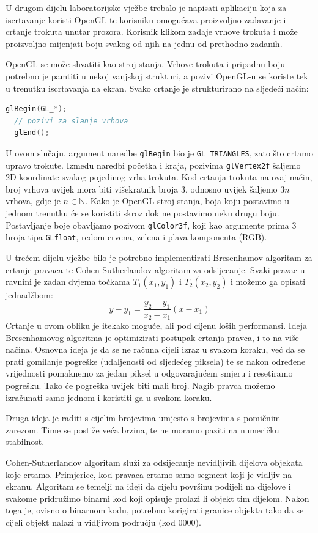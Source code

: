 \documentclass[a4paper,12pt]{article}
\begin{document}
U drugom dijelu laboratorijske vježbe trebalo je napisati aplikaciju koja
za iscrtavanje koristi OpenGL te korisniku omogućava proizvoljno zadavanje
i crtanje trokuta unutar prozora. Korisnik klikom zadaje vrhove trokuta i
može proizvoljno mijenjati boju svakog od njih na jednu od prethodno zadanih.

OpenGL se može shvatiti kao stroj stanja. Vrhove trokuta i pripadnu boju potrebno je pamtiti u nekoj vanjskoj strukturi, a pozivi OpenGL-u se koriste tek
u trenutku iscrtavanja na ekran. Svako crtanje je strukturirano na sljedeći
način:

\begin{lstlisting}[language=C]
  glBegin(GL_*);
  // pozivi za slanje vrhova
  glEnd();
\end{lstlisting}
U ovom slučaju, argument naredbe {\verb|glBegin|} bio je {\verb|GL_TRIANGLES|}, zato što crtamo upravo trokute. Između naredbi početka i kraja, pozivima
{\verb|glVertex2f|} šaljemo 2D koordinate svakog pojedinog vrha trokuta. Kod crtanja trokuta na ovaj način, broj vrhova uvijek mora biti višekratnik broja 3, odnosno uvijek šaljemo $3n$ vrhova, gdje je
$n \in \mathbb{N}$.
Kako je OpenGL stroj stanja, boja koju postavimo u jednom trenutku će se koristiti skroz dok ne postavimo neku drugu boju. Postavljanje boje obavljamo pozivom
{\verb|glColor3f|}, koji kao argumente prima 3 broja tipa {\verb|GLfloat|}, redom crvena, zelena i plava komponenta (RGB).

U trećem dijelu vježbe bilo je potrebno implementirati Bresenhamov algoritam
za crtanje pravaca te Cohen-Sutherlandov algoritam za odsijecanje. Svaki pravac u ravnini je zadan dvjema točkama $T_1(x_1, y_1)$ i $T_2(x_2, y_2)$ i možemo ga opisati jednadžbom:
\[
y - y_1 = \frac{y_2 - y_1}{x_2 - x_1}(x - x_1)
\]
Crtanje u ovom obliku je itekako moguće, ali pod cijenu loših performansi.
Ideja Bresenhamovog algoritma je optimizirati postupak crtanja pravca, i to
na više načina. Osnovna ideja je da se ne računa cijeli izraz u svakom koraku, već da se prati gomilanje pogreške (udaljenosti od sljedećeg piksela) te se nakon određene vrijednosti pomaknemo za jedan piksel u odgovarajućem smjeru i
resetiramo pogrešku. Tako će pogreška uvijek biti mali broj.
Nagib pravca možemo izračunati samo jednom i koristiti ga u svakom koraku.

Druga ideja je raditi s cijelim brojevima umjesto s brojevima s pomičnim zarezom. Time se postiže veća brzina, te ne moramo paziti na numeričku stabilnost.

Cohen-Sutherlandov algoritam služi za odsijecanje nevidljivih dijelova
objekata koje crtamo. Primjerice, kod pravaca crtamo samo  segment koji je
vidljiv na ekranu. Algoritam se temelji na ideji da cijelu površinu podijeli
na dijelove i svakome pridružimo binarni kod koji opisuje prolazi li objekt
tim dijelom. Nakon toga je, ovisno o binarnom kodu, potrebno korigirati
granice objekta tako da se cijeli objekt nalazi u vidljivom području (kod 0000).
\end{document}
